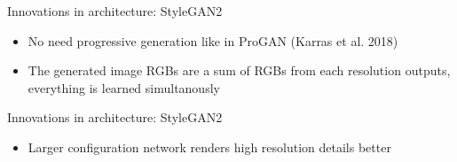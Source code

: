 \begin{frame}{Innovations in architecture: StyleGAN2}
\protect\hypertarget{innovations-in-architecture-stylegan2-3}{}

\begin{itemize}
\tightlist
\item
  No need progressive generation like in ProGAN (Karras et al. 2018)
\item
  The generated image RGBs are a sum of RGBs from each resolution
  outputs, everything is learned simultanously
\end{itemize}


\end{frame}

\begin{frame}{Innovations in architecture: StyleGAN2}
\protect\hypertarget{innovations-in-architecture-stylegan2-4}{}

\begin{itemize}
\tightlist
\item
  Larger configuration network renders high resolution details better
\end{itemize}


\end{frame}

